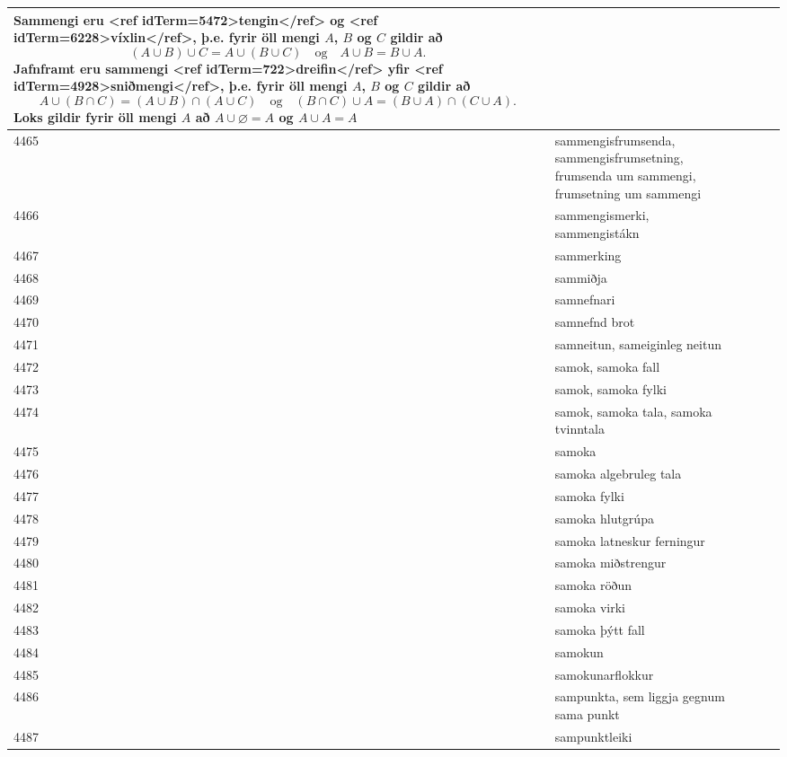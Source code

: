 \begin{longtable}{p{}|p{}|p{}|p{}|p{}}
Sammengi eru <ref idTerm=5472>tengin</ref> og <ref idTerm=6228>víxlin</ref>, þ.e. fyrir öll mengi $A$, $B$ og $C$ gildir að \[ (A \cup B) \cup C = A \cup (B \cup C) \quad \text{og} \quad A \cup B = B \cup A. \] Jafnframt eru sammengi <ref idTerm=722>dreifin</ref> yfir <ref idTerm=4928>sniðmengi</ref>, þ.e. fyrir öll mengi $A$, $B$ og $C$ gildir að \[ A \cup (B \cap C) = (A \cup B) \cap (A \cup C) \quad \text{og} \quad (B \cap C) \cup A = (B \cup A) \cap (C \cup A). \] Loks gildir fyrir öll mengi $A$ að $A \cup \varnothing = A$ og $A \cup A = A$ & \\
\hline
4465 & sammengisfrumsenda, sammengisfrumsetning, frumsenda um sammengi, frumsetning um sammengi &  &  &  \\
\hline
4466 & sammengismerki, sammengistákn &  &  &  \\
\hline
4467 & sammerking &  &  &  \\
\hline
4468 & sammiðja &  &  &  \\
\hline
4469 & samnefnari &  &  &  \\
\hline
4470 & samnefnd brot &  &  &  \\
\hline
4471 & samneitun, sameiginleg neitun &  &  &  \\
\hline
4472 & samok, samoka fall &  &  &  \\
\hline
4473 & samok, samoka fylki &  &  &  \\
\hline
4474 & samok, samoka tala, samoka tvinntala &  &  &  \\
\hline
4475 & samoka &  &  &  \\
\hline
4476 & samoka algebruleg tala &  &  &  \\
\hline
4477 & samoka fylki &  &  &  \\
\hline
4478 & samoka hlutgrúpa &  &  &  \\
\hline
4479 & samoka latneskur ferningur &  &  &  \\
\hline
4480 & samoka miðstrengur &  &  &  \\
\hline
4481 & samoka röðun &  &  &  \\
\hline
4482 & samoka virki &  &  &  \\
\hline
4483 & samoka þýtt fall &  &  &  \\
\hline
4484 & samokun &  &  &  \\
\hline
4485 & samokunarflokkur &  &  &  \\
\hline
4486 & sampunkta, sem liggja gegnum sama punkt &  &  &  \\
\hline
4487 & sampunktleiki &  &  &  \\

\end{longtable}
